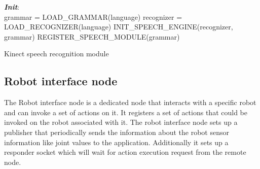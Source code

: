 \begin{algorithm}[H]
 \textbf{\emph{Init}}:\\
 \quad grammar = LOAD\_GRAMMAR(language)\;
 \quad recognizer = LOAD\_RECOGNIZER(language)\;
 \quad INIT\_SPEECH\_ENGINE(recognizer, grammar)\;
 \quad REGISTER\_SPEECH\_MODULE(grammar)\;
 \caption{Kinect speech recognition module}
 \label{alg:speech_recognize}
\end{algorithm}

\subsection{Robot interface node} 
The Robot interface node is a dedicated node that interacts with a specific robot and can invoke a set of actions on it.  It registers a set of actions that could be invoked on the robot associated with it. The robot interface node sets up a publisher that periodically sends the information about the robot sensor information like joint values to the application. Additionally it sets up a responder socket which will wait for action execution request from the remote node. 

